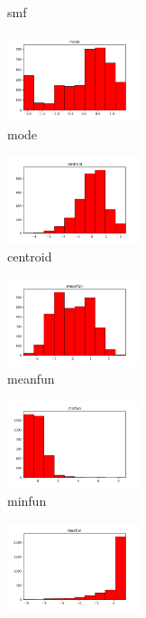 \documentclass[a4paper]{article}    %
\begin{document}
\begin{figure}[H]
\begin{subfigure}{0.32\textwidth}
        \caption{smf}
        \label{fig:sub_std_9}
    \end{subfigure}\hfill
    \begin{subfigure}{0.32\textwidth}
        \centering
        \includegraphics[width=3.85cm]{std_9_mode}
        \caption{mode}
        \label{fig:sub_std_10}
    \end{subfigure}\hfill
    \begin{subfigure}{0.32\textwidth}
        \centering
        \includegraphics[width=3.85cm]{std_10_centroid}
        \caption{centroid}
        \label{fig:sub_std_11}
    \end{subfigure}\hfill
    \begin{subfigure}{0.32\textwidth}
        \centering
        \includegraphics[width=3.85cm]{std_11_meanfun}
        \caption{meanfun}
        \label{fig:sub_std_12}
    \end{subfigure}\hfill
    \begin{subfigure}{0.32\textwidth}
        \centering
        \includegraphics[width=3.85cm]{std_12_minfun}
        \caption{minfun}
        \label{fig:sub_std_13}
    \end{subfigure}\hfill
    \begin{subfigure}{0.32\textwidth}
        \centering
        \includegraphics[width=3.85cm]{std_13_maxfun}

\end{subfigure}
\end{figure}
\end{document}
